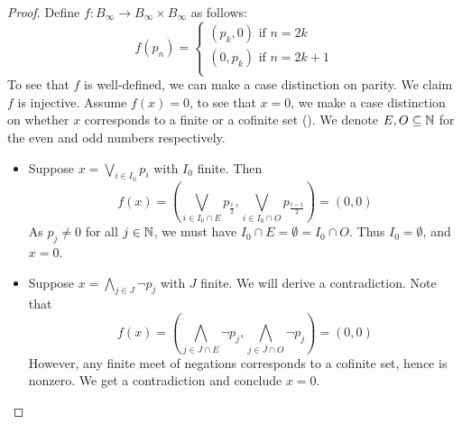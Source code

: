 \begin{proof}
%
  Define $f:B_\infty \to B_\infty \times B_\infty$ as follows:
  \begin{equation}
    f(p_n) =\begin{cases}
      (p_k,0) \text{ if } n = 2k\\
      (0,p_k) \text{ if } n = 2k+1\\
    \end{cases}
  \end{equation}
  To see that $f$ is well-defined, we can make a case distinction on parity. 
  We claim $f$ is injective. Assume $f(x) = 0$, 
  to see that $x=0$, we make a case distinction on whether $x$ corresponds to a finite or a cofinite set 
  ().
%
  We denote $E,O\subseteq \mathbb{N}$ for the even and odd numbers respectively. 
  \begin{itemize}
    \item Suppose 
      $x = \bigvee_{i\in I_0} p_i$ with $I_0$ finite. 
      Then 
      $$f(x) = (\bigvee_{i\in I_0 \cap E } p_{\frac i2} , \bigvee_{i\in I_0 \cap O } p_{\frac {i-1}2} ) = (0,0)$$
      As $p_j\neq 0$ for all $j\in\mathbb{N}$, we must have $I_0 \cap E = \emptyset = I_0 \cap O$. 
      Thus $I_0= \emptyset$, and $x = 0$. 
    \item Suppose 
      $x = \bigwedge_{j\in J} \neg p_j$ with $J$ finite. %
      We will derive a contradiction. %
      Note that   
      $$f(x) = (\bigwedge_{j\in J \cap E } \neg p_j , \bigwedge_{j\in J \cap O } \neg p_j ) = (0,0)$$
      However, any finite meet of negations corresponds to a cofinite set, hence is nonzero. 
      We get a contradiction and conclude $x=0$. 

\end{itemize}
\end{proof}
